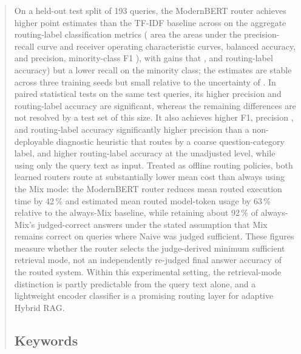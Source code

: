 \documentclass[english, bibtex]{kththesis}               %
\numberwithin{listing}{chapter}
\providecommand{\DIFaddtex}[1]{{\protect\color{blue} \sf #1}} %
\providecommand{\DIFdeltex}[1]{{\protect\color{red} \scriptsize #1}} %
\providecommand{\DIFaddbegin}{} %
\providecommand{\DIFaddend}{} %
\providecommand{\DIFdelbegin}{} %
\providecommand{\DIFdelend}{} %
\providecommand{\DIFadd}[1]{\texorpdfstring{\DIFaddtex{#1}}{#1}} %
\providecommand{\DIFdel}[1]{\texorpdfstring{\DIFdeltex{#1}}{}} %
\begin{document}
\begin{abstract}
\begin{scontents}[store-env=abstracts,print-env=true]
On a held-out test split of 193 queries, the ModernBERT router achieves higher point estimates than the TF-IDF baseline \DIFdelbegin \DIFdel{across }\DIFdelend \DIFaddbegin \DIFadd{on }\DIFaddend the aggregate routing-label classification metrics (\DIFdelbegin \DIFdel{area }\DIFdelend \DIFaddbegin \DIFadd{the areas }\DIFaddend under the precision-recall \DIFdelbegin \DIFdel{curve}\DIFdelend \DIFaddbegin \DIFadd{and receiver operating characteristic curves}\DIFaddend , balanced accuracy, \DIFdelbegin \DIFdel{and }\DIFdelend \DIFaddbegin \DIFadd{precision, }\DIFaddend minority-class F1\DIFdelbegin \DIFdel{), with gains that }\DIFdelend \DIFaddbegin \DIFadd{, and routing-label accuracy) but a lower recall on the minority class; the estimates }\DIFaddend are stable across three training seeds\DIFdelbegin \DIFdel{but small relative to the uncertainty of }\DIFdelend \DIFaddbegin \DIFadd{. In paired statistical tests on the same test queries, its higher precision and routing-label accuracy are significant, whereas the remaining differences are not resolved by }\DIFaddend a test set \DIFaddbegin \DIFadd{of }\DIFaddend this size. It also achieves \DIFdelbegin \DIFdel{higher F1, precision , and routing-label accuracy }\DIFdelend \DIFaddbegin \DIFadd{significantly higher precision }\DIFaddend than a non-deployable diagnostic heuristic that routes by a coarse question-category label, \DIFaddbegin \DIFadd{and higher routing-label accuracy at the unadjusted level, }\DIFaddend while using only the query text as input. Treated as offline routing policies, both learned routers route at substantially lower mean cost than always using the Mix mode: the ModernBERT router reduces mean routed execution time by 42\,\% and estimated mean routed model-token usage by 63\,\% relative to the always-Mix baseline, while retaining about 92\,\% of always-Mix's judged-correct answers under the stated assumption that Mix remains correct on queries where Naive was judged sufficient. These figures measure whether the router selects the judge-derived minimum sufficient retrieval mode, not an independently re-judged final answer accuracy of the routed system. Within this experimental setting, the retrieval-mode distinction is partly predictable from the query text alone, and a lightweight encoder classifier is a promising routing layer for adaptive Hybrid RAG.
\end{scontents}

\subsection*{Keywords}
\begin{scontents}[store-env=keywords,print-env=true]
\end{scontents}
\end{abstract}
\end{document}
